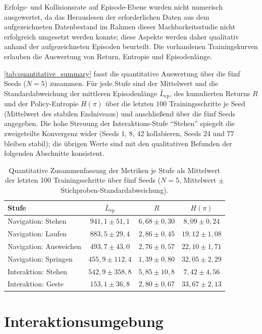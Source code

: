 Erfolgs- und Kollisionsrate auf Episode-Ebene wurden nicht numerisch ausgewertet, da das Herauslesen der erforderlichen Daten aus dem aufgezeichneten Datenbestand im Rahmen dieser Machbarkeitsstudie nicht erfolgreich umgesetzt werden konnte; diese Aspekte werden daher qualitativ anhand der aufgezeichneten Episoden beurteilt. Die vorhandenen Trainingskurven erlauben die Auswertung von Return, Entropie und Episodenlänge.

\autoref{tab:quantitative_summary} fasst die quantitative Auswertung über die fünf Seeds ($N=5$) zusammen. Für jede Stufe sind der Mittelwert und die Standardabweichung der mittleren Episodenlänge $\bar{L}_{\text{ep}}$, des kumulierten Returns $R$ und der Policy-Entropie $H(\pi)$ über die letzten $100$ Trainingsschritte je Seed (Mittelwert des stabilen Endniveaus) und anschließend über die fünf Seeds angegeben. Die hohe Streuung der Interaktions-Stufe \enquote{Stehen} spiegelt die zweigeteilte Konvergenz wider (Seeds 1, 8, 42 kollabieren, Seeds 24 und 77 bleiben stabil); die übrigen Werte sind mit den qualitativen Befunden der folgenden Abschnitte konsistent.

\begin{table}[htbp]
\centering
\small
\begin{tabular}{lccc}
\toprule
\textbf{Stufe} & $\bar{L}_{\text{ep}}$ & $R$ & $H(\pi)$ \\
\midrule
Navigation: Stehen & $941{,}1\pm51{,}1$ & $6{,}68\pm0{,}30$ & $8{,}09\pm0{,}24$ \\
Navigation: Laufen & $883{,}5\pm29{,}4$ & $2{,}86\pm0{,}45$ & $19{,}12\pm1{,}08$ \\
Navigation: Ausweichen & $493{,}7\pm43{,}0$ & $2{,}76\pm0{,}57$ & $22{,}10\pm1{,}71$ \\
Navigation: Springen & $455{,}9\pm112{,}4$ & $1{,}39\pm0{,}80$ & $32{,}05\pm2{,}29$ \\
Interaktion: Stehen & $542{,}9\pm358{,}8$ & $5{,}85\pm10{,}8$ & $7{,}42\pm4{,}56$ \\
Interaktion: Geste & $153{,}1\pm36{,}8$ & $2{,}80\pm0{,}67$ & $33{,}67\pm2{,}13$ \\
\bottomrule
\end{tabular}
\caption{Quantitative Zusammenfassung der Metriken je Stufe als Mittelwert der letzten 100 Trainingsschritte über fünf Seeds ($N=5$, Mittelwert $\pm$ Stichproben-Standardabweichung).}
\label{tab:quantitative_summary}
\end{table}

\section{Interaktionsumgebung}

